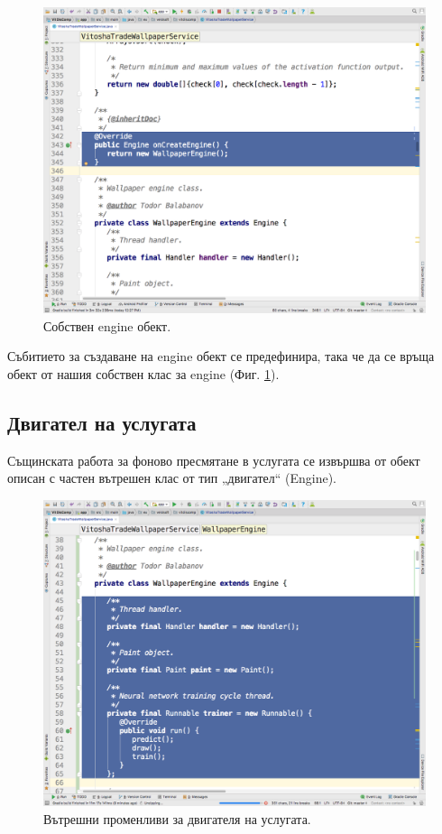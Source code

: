 \documentclass[book,14pt,oneside,openany]{memoir}
\begin{document}
\begin{figure}[h]
  \centering
  \includegraphics[height=0.45\pdfpageheight]{pic0045}
  \caption{Собствен engine обект.}
\label{fig:pic0045}
\end{figure}
\FloatBarrier

Събитието за създаване на engine обект се предефинира, така че да се връща обект от нашия собствен клас за engine (Фиг. \ref{fig:pic0045}). 

\subsection{Двигател на услугата}

Същинската работа за фоново пресмятане в услугата се извършва от обект описан с частен вътрешен клас от тип „двигател“ (Engine).

\begin{figure}[h]
  \centering
  \includegraphics[height=0.45\pdfpageheight]{pic0046}
  \caption{Вътрешни променливи за двигателя на услугата.}
\label{fig:pic0046}
\end{figure}
\FloatBarrier
\end{document}
